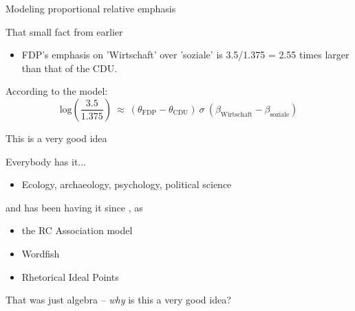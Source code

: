 \documentclass{hertieteaching}
\begin{document}
\begin{frame}{Modeling proportional relative emphasis}

That small fact from earlier
\begin{itemize}
  \item FDP's emphasis on 'Wirtschaft' over 'soziale' is 3.5/1.375 = 2.55 
times larger than that of the CDU.
\end{itemize}

According to the model:
$$
\text{log}\left(\frac{3.5}{1.375}\right) ~\approx~ (\theta_\text{FDP} - \theta_\text{CDU}) ~\sigma~ (\beta_\text{Wirtschaft} - \beta_\text{soziale})
$$
\end{frame}
\begin{frame}{This is a very good idea}

Everybody has it...
\begin{itemize}
  \item Ecology, archaeology, psychology, political science
\end{itemize}
and has been having it since \textcite{Hirschfeld1935}, as
\begin{itemize}
  \item the RC Association model \parencite{Goodman1981}
  \item Wordfish \parencite{Slapin.Proksch2008}
  \item Rhetorical Ideal Points \parencite{Monroe.Maeda2004}
\end{itemize}

\bigskip
\pause

That was just algebra -- \textit{why} is this a very good idea?
\end{frame}
\end{document}
